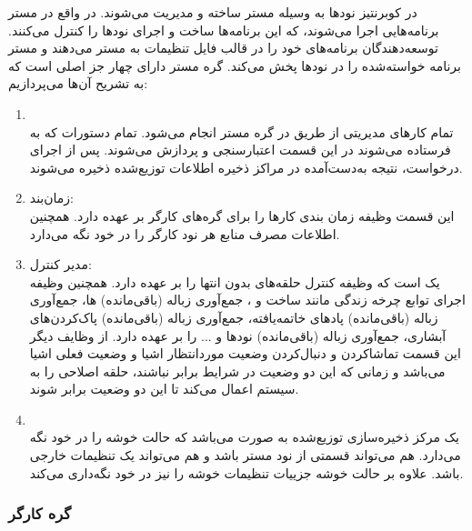 در کوبرنتیز نودها به وسیله مستر ساخته و مدیریت می‌شوند. در واقع در مستر برنامه‌هایی اجرا می‌شوند، که این برنامه‌ها ساخت و اجرای نودها را کنترل می‌کنند. توسعه‌دهندگان برنامه‌های خود را در قالب فایل تنظیمات به مستر می‌دهند و مستر برنامه خواسته‌شده را در نودها پخش می‌کند.
\newline
\newline
گره مستر دارای چهار جز اصلی است که به تشریح آن‌ها می‌پردازیم:
\begin{enumerate}
	\item
	\\
	تمام کارهای مدیریتی از طریق 
	در گره مستر انجام می‌شود. تمام دستورات
	که به
	فرستاده می‌شوند در این قسمت اعتبارسنجی و پردازش می‌شوند. پس از اجرای درخواست، نتیجه به‌دست‌آمده در مراکز ذخیره اطلاعات توزیع‌شده ذخیره می‌شوند.
	\item
	زمان‌بند: \\
	این قسمت وظیفه زمان بندی کارها را برای گره‌های کارگر بر عهده دارد. همچنین اطلاعات مصرف منابع هر نود کارگر را در خود نگه می‌دارد.
	\item
	مدیر کنترل:\\
	یک
	است که وظیفه کنترل حلقه‌های بدون انتها را بر عهده دارد. همچنین وظیفه اجرای توابع چرخه زندگی مانند ساخت
	و
	، جمع‌آوری زباله (باقی‌مانده) 
	ها، جمع‌آوری زباله (باقی‌مانده) پادهای خاتمه‌یافته، جمع‌آوری زباله (باقی‌مانده) پاک‌کردن‌های آبشاری، جمع‌آوری زباله (باقی‌مانده) نودها و ... را بر عهده دارد. از وظایف دیگر این قسمت تماشا‌کردن و دنبال‌کردن وضعیت مورد‌انتظار اشیا و وضعیت فعلی اشیا می‌باشد و زمانی که این دو وضعیت در شرایط برابر نباشند، حلقه اصلاحی را به سیستم اعمال می‌کند تا این دو وضعیت برابر شوند.
	\item
	\\
	یک مرکز ذخیره‌سازی توزیع‌شده به صورت
	می‌باشد که حالت خوشه را در خود نگه می‌دارد. هم می‌تواند قسمتی از نود مستر باشد و هم می‌تواند یک تنظیمات خارجی باشد. علاوه بر حالت خوشه جزییات تنظیمات خوشه را نیز در خود نگه‌داری می‌کند.
\end{enumerate}


\subsubsection*{گره کارگر}

